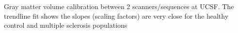 \label{fig:hcms_GMV} Gray matter volume calibration between 2 scanners/sequences at UCSF. The trendline fit shows the slopes (scaling factors) are very close for the healthy control and multiple sclerosis populations